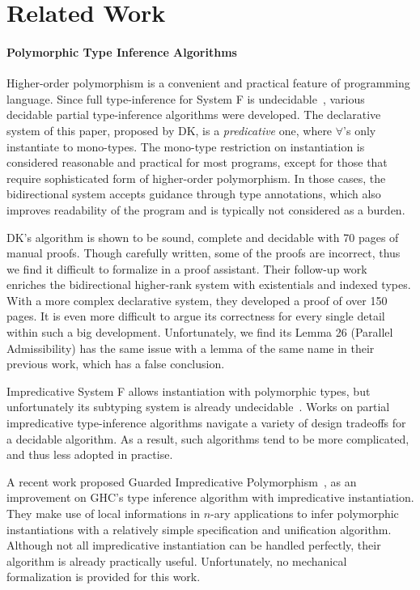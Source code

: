 \section{Related Work}

\paragraph{Polymorphic Type Inference Algorithms}
Higher-order polymorphism is a convenient and practical feature of programming language.
Since full type-inference for System F is undecidable~\cite{wells1999typability},
various decidable partial type-inference algorithms were developed.
The declarative system of this paper, proposed by DK, is a \emph{predicative} one,
where $\forall$'s only instantiate to mono-types.
The mono-type restriction on instantiation is considered reasonable and practical for most programs,
except for those that require sophisticated form of higher-order polymorphism.
In those cases, the bidirectional system accepts guidance through type annotations,
which also improves readability of the program and is typically not considered as a burden.

DK's algorithm is shown to be sound, complete and decidable with 70 pages of manual proofs.
Though carefully written, some of the proofs are incorrect,
thus we find it difficult to formalize in a proof assistant.
Their follow-up work~\cite{} enriches the bidirectional higher-rank system with
existentials and indexed types.
With a more complex declarative system, they developed a proof of over 150 pages.
It is even more difficult to argue its correctness for every single detail within such a big development.
Unfortunately, we find its Lemma 26 (Parallel Admissibility) has the same issue with
a lemma of the same name in their previous work, which has a false conclusion.

Impredicative System F allows instantiation with polymorphic types,
but unfortunately its subtyping system is already undecidable~\cite{tiuryn1996subtyping}.
Works on partial impredicative type-inference algorithms\cite{le2003ml,leijen2008hmf,vytiniotis2008fph}
navigate a variety of design tradeoffs for a decidable algorithm.
As a result, such algorithms tend to be more complicated, and thus less adopted in practise.

A recent work proposed Guarded Impredicative Polymorphism~\cite{},
as an improvement on GHC's type inference algorithm with impredicative instantiation.
They make use of local informations in $n$-ary applications to
infer polymorphic instantiations with a relatively simple specification and unification algorithm.
Although not all impredicative instantiation can be handled perfectly,
their algorithm is already practically useful.
Unfortunately, no mechanical formalization is provided for this work.

